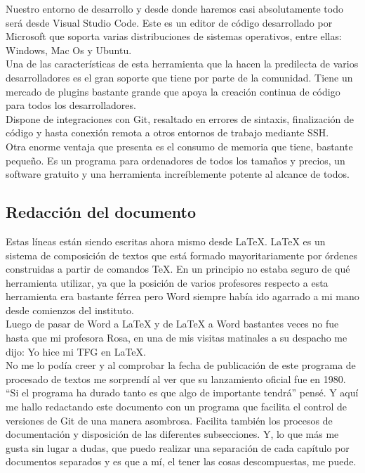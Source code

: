 Nuestro entorno de desarrollo y desde donde haremos casi absolutamente todo será desde Visual Studio Code. Este es un editor de código desarrollado por Microsoft que soporta varias distribuciones de sistemas operativos, entre ellas: Windows, Mac Os y Ubuntu. 
\\Una de las características de esta herramienta que la hacen la predilecta de varios desarrolladores es el gran soporte que tiene por parte de la comunidad. Tiene un mercado de plugins bastante grande que apoya la creación continua de código para todos los desarrolladores.
\\Dispone de integraciones con Git, resaltado en errores de sintaxis, finalización de código y hasta conexión remota a otros entornos de trabajo mediante SSH.
\\Otra enorme ventaja que presenta es el consumo de memoria que tiene, bastante pequeño. Es un programa para ordenadores de todos los tamaños y precios, un software gratuito y una herramienta increíblemente potente al alcance de todos.

\subsection{Redacción del documento}

Estas líneas están siendo escritas ahora mismo desde LaTeX. LaTeX es un sistema de composición de textos que está formado mayoritariamente por órdenes construidas a partir de comandos TeX. En un principio no estaba seguro de qué herramienta utilizar, ya que la posición de varios profesores respecto a esta herramienta era bastante férrea pero Word siempre había ido agarrado a mi mano desde comienzos del instituto.
\\Luego de pasar de Word a LaTeX y de LaTeX a Word bastantes veces no fue hasta que mi profesora Rosa, en una de mis visitas matinales a su despacho me dijo: Yo hice mi TFG en LaTeX.
\\No me lo podía creer y al comprobar la fecha de publicación de este programa de procesado de textos me sorprendí al ver que su lanzamiento oficial fue en 1980. ``Si el programa ha durado tanto es que algo de importante tendrá'' pensé. Y aquí me hallo redactando este documento con un programa que facilita el control de versiones de Git de una manera asombrosa. Facilita también los procesos de documentación y disposición de las diferentes subsecciones. Y, lo que más me gusta sin lugar a dudas, que puedo realizar una separación de cada capítulo por documentos separados y es que a mí, el tener las cosas descompuestas, me puede.

